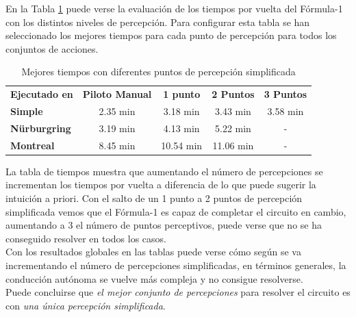 En la Tabla \ref{tab:tiempos_percepciones} puede verse la evaluación de los tiempos por vuelta del Fórmula-1 con los distintos niveles de percepción. Para configurar esta tabla se han seleccionado los mejores tiempos para cada punto de percepción para todos los conjuntos de acciones.\\

\begin{table}[ht!]
\centering
\begin{tabular}{|l|c|c|c|c|}
\hline
\rowcolor[HTML]{EFEFEF} 
\multicolumn{5}{|c|}{\cellcolor[HTML]{EFEFEF}\textbf{Mejor tiempo / Percepciones}}                                               \\ \hline
\rowcolor[HTML]{EFEFEF} 
\textbf{Ejecutado en}                        & \textbf{Piloto Manual} & \textbf{1 punto} & \textbf{2 Puntos} & \textbf{3 Puntos} \\ \hline
\cellcolor[HTML]{EFEFEF}\textbf{Simple}      & 2.35 min               & 3.18 min         & 3.43 min          & 3.58 min          \\ \hline
\cellcolor[HTML]{EFEFEF}\textbf{Nürburgring} & 3.19 min               & 4.13 min         & 5.22 min          & -                 \\ \hline
\cellcolor[HTML]{EFEFEF}\textbf{Montreal}    & 8.45 min               & 10.54 min        & 11.06 min         & -                 \\ \hline
\end{tabular}
\caption{Mejores tiempos con diferentes puntos de percepción simplificada}
\label{tab:tiempos_percepciones}
\end{table}

La tabla de tiempos muestra que aumentando el número de percepciones se incrementan los tiempos por vuelta a diferencia de lo que puede sugerir la intuición a priori. Con el salto de un 1 punto a 2 puntos de percepción simplificada vemos que el Fórmula-1 es capaz de completar el circuito en cambio, aumentando a 3 el número de puntos perceptivos, puede verse que no se ha conseguido resolver en todos los casos.\\

Con los resultados globales en las tablas puede verse cómo según se va incrementando el número de percepciones simplificadas, en términos generales, la conducción autónoma se vuelve más compleja y no consigue resolverse.\\

Puede concluirse que \textit{el mejor conjunto de percepciones} para resolver el circuito es con \textit{una única percepción simplificada}.

